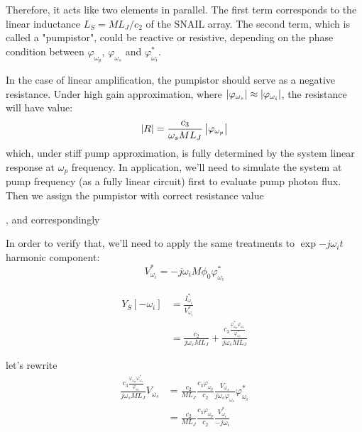 \documentclass[aip,reprint]{revtex4-2}
\begin{document}
Therefore, it acts like two elements in parallel. The first term corresponds to the linear inductance $L_S = ML_J/c_2$ of the SNAIL array. The second term, which is called a "pumpistor", could be reactive or resistive, depending on the phase condition between $\varphi_{\omega_p}$, $\varphi_{\omega_s}$ and $\varphi^*_{\omega_i}$. 

In the case of linear amplification, the pumpistor should serve as a negative resistance. Under high gain approximation, where $\left | \varphi_{\omega_s} \right | \approx \left | \varphi_{\omega_i} \right |$, the resistance will have value: 
\begin{equation}
	\abs{R} = \frac{c_3}{\omega_s ML_J} \abs{\varphi_{\omega_p}}
\end{equation}
which, under stiff pump approximation, is fully determined by the system linear response at $\omega_p$ frequency. In application, we'll need to simulate the system at pump frequency (as a fully linear circuit) first to evaluate pump photon flux. Then we assign the pumpistor with correct resistance value 

, and correspondingly 



In order to verify that, we'll need to apply the same treatments to $\exp{- j\omega_i t}$ harmonic component: 
\begin{equation}
	V^*_{\omega_i} = -j\omega_i M\phi_0\varphi^*_{\omega_i}
\end{equation}

\begin{equation}
\begin{aligned}
Y_S[- \omega_i] &= \frac{I^*_{\omega_i}}{V^*_{\omega_i}}\\
&= \frac{c_2}{j\omega_s ML_J} + \frac{c_3 \frac{\varphi^*_{\omega_p} \varphi_{\omega_s}}{\varphi^*_{\omega_i}}}{j\omega_s ML_J}
\end{aligned}
\end{equation}




let's rewrite 
\[
\begin{aligned}
\frac{c_3 \frac{\varphi_{\omega_p} \varphi^*_{\omega_i}}{\varphi_{\omega_s}}}{j\omega_s ML_J}V_{\omega_s} 
&= \frac{c_2 }{ML_J}\frac{c_3\varphi_{\omega_p}}{c_2} \frac{V_{\omega_s}}{j\omega_s\varphi_{\omega_s}} \varphi^*_{\omega_i}\\
&= \frac{c_2 }{ML_J}\frac{c_3\varphi_{\omega_p}}{c_2} 
\frac{V^*_{\omega_i}}{-j\omega_i}
\end{aligned}
\]
\end{document}
